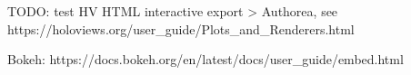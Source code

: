 TODO: test HV HTML interactive export > Authorea, see https://holoviews.org/user_guide/Plots_and_Renderers.html

Bokeh: https://docs.bokeh.org/en/latest/docs/user_guide/embed.html